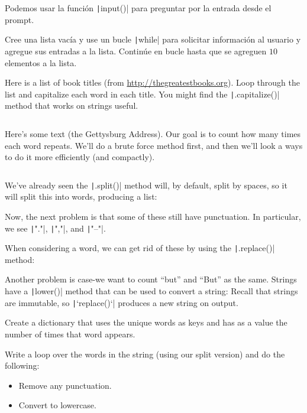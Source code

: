 \begin{questions}
	Podemos usar la función \texttt|input()| para preguntar por
	la entrada desde el prompt.

	Cree una lista vacía y use un bucle \texttt|while| para solicitar
	información al usuario y agregue sus entradas a la lista.
	Continúe en bucle hasta que se agreguen $10$ elementos a la lista.

	\question

	Here is a list of book titles
	(from \url{http://thegreatestbooks.org}).
	Loop through the list and capitalize each word in each title.
	You might find the \texttt|.capitalize()| method that
	works on strings useful.
	\inputminted[fontsize=\tiny,linenos]{python}{q6.py}

	\question

	Here's some text (the Gettysburg Address).
	Our goal is to count how many times each word repeats.
	We'll do a brute force method first, and then we'll look a ways to
	do it more efficiently (and compactly).

	\inputminted[fontsize=\tiny,linenos]{python}{q7.py}

	We've already seen the \texttt|.split()| method will,
	by default, split by spaces, so it will split this into words,
	producing a list:

	Now, the next problem is that some of these still have punctuation.
	In particular, we see \texttt|"."|,
	\texttt|","|, and \texttt|"--"|.

	When considering a word, we can get rid of these by using the
	\texttt|.replace()| method:

	Another problem is case-we want to count ``but'' and ``But'' as the same.
	Strings have a \texttt|lower()| method that can be used
	to convert a string:
	Recall that strings are immutable, so \texttt|`replace()`| produces a new string on output.

	Create a dictionary that uses the unique words as keys and has as a
	value the number of times that word appears.

	Write a loop over the words in the string (using our split version)
	and do the following:
	\begin{itemize}
		\item

		      Remove any punctuation.

		\item

		      Convert to lowercase.


\end{itemize}
\end{questions}
